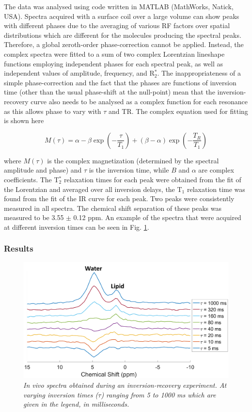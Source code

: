 The data was analysed using code written in MATLAB (MathWorks, Natick, USA). Spectra acquired with a surface coil over a large volume can show peaks with different phases due to the averaging of various \ac{RF} factors over spatial distributions which are different for the molecules producing the spectral peaks. Therefore, a global zeroth-order phase-correction cannot be applied. Instead, the complex spectra were fitted to a sum of two complex Lorentzian lineshape functions employing independent phases for each spectral peak, as well as independent values of amplitude, frequency, and R$_2^*$. The inappropriateness of a simple phase-correction and the fact that the phases are functions of inversion time (other than the usual phase-shift at the null-point) mean that the inversion-recovery curve also needs to be analysed as a complex function for each resonance as this allows phase to vary with $\tau$ and \ac{TR}. The complex equation used for fitting is shown here  

\begin{equation}
    M(\tau) = \alpha - \beta\exp(-\frac{\tau}{T_1}) + (\beta - \alpha)\exp(-\frac{T_R}{T_1})
    \label{eqn:Lip:IR}
\end{equation}

where $M(\tau)$ is the complex magnetization (determined by the spectral amplitude and phase) and $\tau$ is the inversion time, while $B$ and $\alpha$ are complex coefficients. The T$_2^*$ relaxation times for each peak were obtained from the fit of the Lorentzian and averaged over all inversion delays, the T$_1$ relaxation time was found from the fit of the \ac{IR} curve for each peak. Two peaks were consistently measured in all spectra. The chemical shift separation of these peaks was measured to be 3.55 $\pm$ 0.12 ppm. An example of the spectra that were acquired at different inversion times can be seen in Fig. \ref{fig:Lip:IR}.

\subsubsection{Results}

\begin{figure}
    \centering
    \includegraphics[width=1\textwidth]{Figures/Lipid/NA_IR.png}
    \caption{\textit{\textit{In vivo} spectra obtained during an inversion-recovery experiment. At varying inversion times ($\tau$) ranging from 5 to 1000 ms which are given in the legend, in milliseconds.}}
    \label{fig:Lip:IR}
\end{figure}

